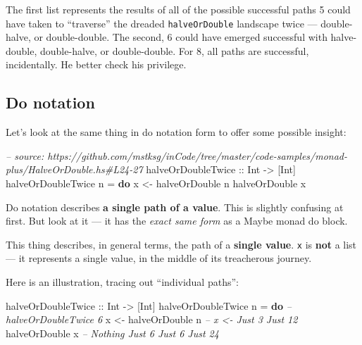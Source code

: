 \documentclass[]{article}
\newenvironment{Shaded}{}{}
\newcommand{\KeywordTok}[1]{\textcolor[rgb]{0.00,0.44,0.13}{\textbf{{#1}}}}
\newcommand{\DataTypeTok}[1]{\textcolor[rgb]{0.56,0.13,0.00}{{#1}}}
\newcommand{\CommentTok}[1]{\textcolor[rgb]{0.38,0.63,0.69}{\textit{{#1}}}}
\newcommand{\OtherTok}[1]{\textcolor[rgb]{0.00,0.44,0.13}{{#1}}}
\newcommand{\FunctionTok}[1]{\textcolor[rgb]{0.02,0.16,0.49}{{#1}}}
\newcommand{\NormalTok}[1]{{#1}}
\begin{document}
The first list represents the results of all of the possible successful
paths 5 could have taken to ``traverse'' the dreaded
\texttt{halveOrDouble} landscape twice --- double-halve, or
double-double. The second, 6 could have emerged successful with
halve-double, double-halve, or double-double. For 8, all paths are
successful, incidentally. He better check his privilege.

\subsection{Do notation}\label{do-notation}

Let's look at the same thing in do notation form to offer some possible
insight:

\begin{Shaded}
\begin{Highlighting}[]
\CommentTok{-- source: https://github.com/mstksg/inCode/tree/master/code-samples/monad-plus/HalveOrDouble.hs#L24-27}
\OtherTok{halveOrDoubleTwice ::} \DataTypeTok{Int} \OtherTok{->} \NormalTok{[}\DataTypeTok{Int}\NormalTok{]}
\NormalTok{halveOrDoubleTwice n }\FunctionTok{=} \KeywordTok{do}
    \NormalTok{x }\OtherTok{<-} \NormalTok{halveOrDouble n}
    \NormalTok{halveOrDouble x}
\end{Highlighting}
\end{Shaded}

Do notation describes \textbf{a single path of a value}. This is
slightly confusing at first. But look at it --- it has the \emph{exact
same form} as a Maybe monad do block.

This thing describes, in general terms, the path of a \textbf{single
value}. \texttt{x} is \textbf{not} a list --- it represents a single
value, in the middle of its treacherous journey.

Here is an illustration, tracing out ``individual paths'':

\begin{Shaded}
\begin{Highlighting}[]
\OtherTok{halveOrDoubleTwice ::} \DataTypeTok{Int} \OtherTok{->} \NormalTok{[}\DataTypeTok{Int}\NormalTok{]}
\NormalTok{halveOrDoubleTwice n }\FunctionTok{=} \KeywordTok{do}       \CommentTok{-- halveOrDoubleTwice 6}
    \NormalTok{x }\OtherTok{<-} \NormalTok{halveOrDouble n        }\CommentTok{-- x <-     Just 3          Just 12}
    \NormalTok{halveOrDouble x             }\CommentTok{--      Nothing  Just 6  Just 6  Just 24}
\end{Highlighting}
\end{Shaded}
\end{document}
